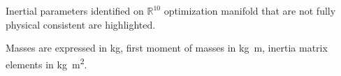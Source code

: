\begin{table*}[ht]
Inertial parameters identified on $\mathbb{R}^{10}$ optimization manifold that are not fully physical consistent are highlighted.

Masses are expressed in \si{kg}, first moment of masses in \si{kg.m}, inertia matrix elements in \si{kg.m^2}.
\end{table*}
